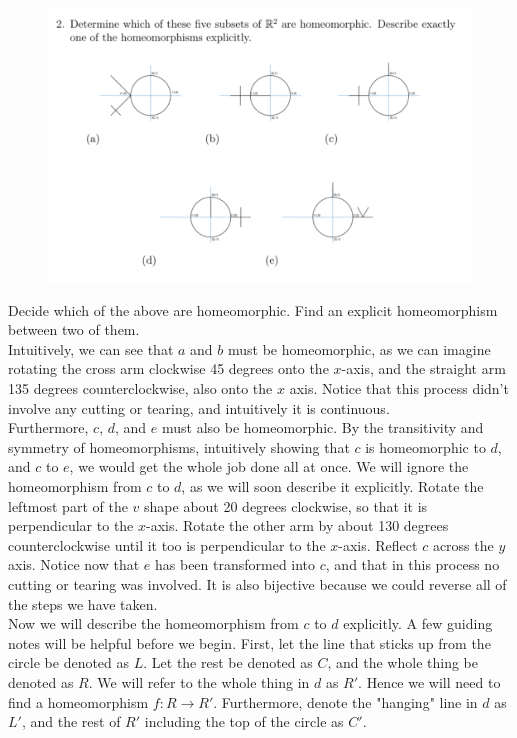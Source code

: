 \documentclass{article}
\begin{document}
\begin{figure}[htbp]
\centerline{\includegraphics[scale=0.5]{homework/circles.png}}
\caption{}
\label{fig}
\end{figure}

 Decide which of the above are homeomorphic. Find an explicit homeomorphism between two of them.\\

 Intuitively, we can see that $a$ and $b$ must be homeomorphic, as we can imagine rotating the cross arm clockwise 45 degrees onto the $x$-axis, and the straight arm 135 degrees counterclockwise, also onto the $x$ axis. Notice that this process didn't involve any cutting or tearing, and intuitively it is continuous. \\

Furthermore, $c$, $d$, and $e$ must also be homeomorphic. By the transitivity and symmetry of homeomorphisms, intuitively showing that $c$ is homeomorphic to $d$, and $c$ to $e$, we would get the whole job done all at once. We will ignore the homeomorphism from $c$ to $d$, as we will soon describe it explicitly. Rotate the leftmost part of the $v$ shape about 20 degrees clockwise, so that it is perpendicular to the $x$-axis. Rotate the other arm by about 130 degrees counterclockwise until it too is perpendicular to the $x$-axis. Reflect $c$ across the $y$ axis. Notice now that $e$ has been transformed into $c$, and that in this process no cutting or tearing was involved. It is also bijective because we could reverse all of the steps we have taken.
\\

Now we will describe the homeomorphism from $c$ to $d$ explicitly. A few guiding notes will be helpful before we begin. First, let the line that sticks up from the circle be denoted as $L$. Let the rest be denoted as $C$, and the whole thing be denoted as $R$. We will refer to the whole thing in $d$ as $R'$. Hence we will need to find a homeomorphism $f:R\rightarrow R'$. Furthermore, denote the "hanging" line in $d$ as $L'$, and the rest of $R'$ including the top of the circle as $C'$.\\
\end{document}
